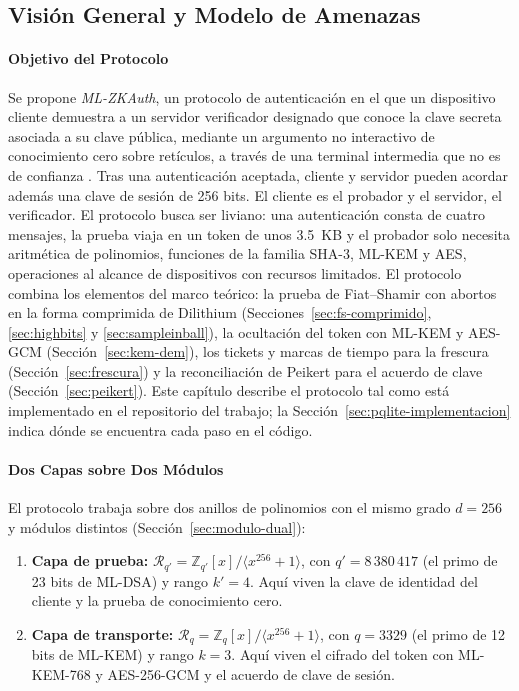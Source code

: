 \subsection{Visión General y Modelo de Amenazas}
\label{sec:architecture-threat-model}

\paragraph{Objetivo del Protocolo}

Se propone \textit{ML-ZKAuth}, un protocolo de autenticación en el que un dispositivo cliente demuestra a un servidor verificador designado que conoce la clave secreta asociada a su clave pública, mediante un argumento no interactivo de conocimiento cero sobre retículos, a través de una terminal intermedia que no es de confianza \cite{yang2025multiserver, ma2026laasso}. Tras una autenticación aceptada, cliente y servidor pueden acordar además una clave de sesión de 256 bits. El cliente es el probador y el servidor, el verificador. El protocolo busca ser liviano: una autenticación consta de cuatro mensajes, la prueba viaja en un token de unos 3.5~KB y el probador solo necesita aritmética de polinomios, funciones de la familia SHA-3, ML-KEM y AES, operaciones al alcance de dispositivos con recursos limitados. El protocolo combina los elementos del marco teórico: la prueba de Fiat--Shamir con abortos en la forma comprimida de Dilithium (Secciones~\ref{sec:fs-comprimido}, \ref{sec:highbits} y \ref{sec:sampleinball}), la ocultación del token con ML-KEM y AES-GCM (Sección~\ref{sec:kem-dem}), los tickets y marcas de tiempo para la frescura (Sección~\ref{sec:frescura}) y la reconciliación de Peikert para el acuerdo de clave (Sección~\ref{sec:peikert}). Este capítulo describe el protocolo tal como está implementado en el repositorio del trabajo; la Sección~\ref{sec:pqlite-implementacion} indica dónde se encuentra cada paso en el código.

\paragraph{Dos Capas sobre Dos Módulos}

El protocolo trabaja sobre dos anillos de polinomios con el mismo grado $d = 256$ y módulos distintos (Sección~\ref{sec:modulo-dual}):
\begin{enumerate}
    \item \textbf{Capa de prueba:} $\mathcal{R}_{q'} = \mathbb{Z}_{q'}[x]/\langle x^{256} + 1 \rangle$, con $q' = 8\,380\,417$ (el primo de 23 bits de ML-DSA) y rango $k' = 4$. Aquí viven la clave de identidad del cliente y la prueba de conocimiento cero.
    \item \textbf{Capa de transporte:} $\mathcal{R}_q = \mathbb{Z}_q[x]/\langle x^{256} + 1 \rangle$, con $q = 3329$ (el primo de 12 bits de ML-KEM) y rango $k = 3$. Aquí viven el cifrado del token con ML-KEM-768 y AES-256-GCM y el acuerdo de clave de sesión.
\end{enumerate}

